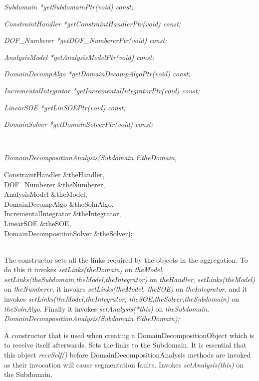 {\em Subdomain  *getSubdomainPtr(void) const;} 

{\em ConstraintHandler *getConstraintHandlerPtr(void) const;}

{\em DOF\_Numberer *getDOF\_NumbererPtr(void) const;}

{\em AnalysisModel  *getAnalysisModelPtr(void) const;}

{\em DomainDecompAlgo  *getDomainDecompAlgoPtr(void) const;}

{\em IncrementalIntegrator *getIncrementalIntegratorPtr(void) const;}

{\em LinearSOE *getLinSOEPtr(void) const;}

{\em DomainSolver *getDomainSolverPtr(void) const;} 



 \\
{\em DomainDecompositionAnalysis(Subdomain \&theDomain, 

\indent\indent\indent\indent\indent\indent\indent ConstraintHandler
\&theHandler, \\ 
\indent\indent\indent\indent\indent\indent\indent DOF\_Numberer \&theNumberer, \\
\indent\indent\indent\indent\indent\indent\indent AnalysisModel \&theModel,\\
\indent\indent\indent\indent\indent\indent\indent DomainDecompAlgo \&theSolnAlgo,\\
\indent\indent\indent\indent\indent\indent\indent IncrementalIntegrator \&theIntegrator,\\
\indent\indent\indent\indent\indent\indent\indent LinearSOE \&theSOE, \\
\indent\indent\indent\indent\indent\indent\indent DomainDecompositionSolver \&theSolver);} \\
The constructor sets all the links required by the objects in the aggregation. To
do this it invokes {\em setLinks(theDomain)} on {\em theModel},
{\em setLinks(theSubdomain,theModel,theIntegrator)} on {\em theHandler}, 
{\em setLinks(theModel)} on {\em theNumberer}, it invokes {\em
setLinks(theModel, theSOE)} on {\em theIntegrator}, and it invokes {\em
setLinks(theModel,theIntegrator, theSOE,theSolver,theSubdomain)} on {\em
theSolnAlgo}. Finally it invokes {\em setAnalysis(*this)} on {\em theSubdomain}. \\

{\em DomainDecompositionAnalysis(Subdomain \&theDomain);} 

A constructor that is used when creating a DomainDecompositionObject which
is to receive itself afterwards. Sets the links to the Subdomain. It is
essential that this object {\em recvSelf()} before DomainDecompositionAnalysis
methods are invoked as their invocation will cause segmentation faults. 
Invokes {\em setAnalysis(this)} on the Subdomain. \\

